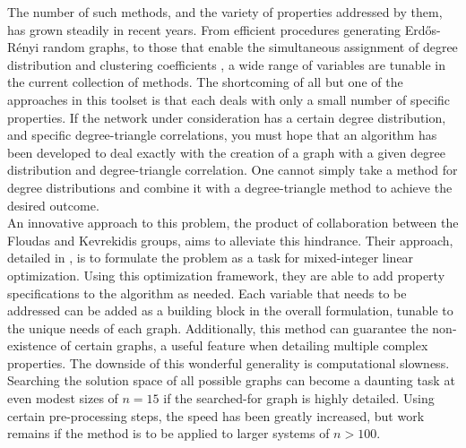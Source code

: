 \documentclass[11pt]{article}
\begin{document}
The number of such methods, and the variety of properties addressed by them, has grown steadily in recent years. From efficient procedures generating Erd\H{o}s-R\'{e}nyi random graphs, to those that enable the simultaneous assignment of degree distribution and clustering coefficients \cite{Batagelj2005} \cite{Deijfen2009}, a wide range of variables are tunable in the current collection of methods. The shortcoming of all but one of the approaches in this toolset is that each deals with only a small number of specific properties. If the network under consideration has a certain degree distribution, and specific degree-triangle correlations, you must hope that an algorithm has been developed to deal exactly with the creation of a graph with a given degree distribution and degree-triangle correlation. One cannot simply take a method for degree distributions and combine it with a degree-triangle method to achieve the desired outcome. \vspace{1mm}\\
An innovative approach to this problem, the product of collaboration between the Floudas and Kevrekidis groups, aims to alleviate this hindrance. Their approach, detailed in \cite{Gounaris2013}, is to formulate the problem as a task for mixed-integer linear optimization. Using this optimization framework, they are able to add property specifications to the algorithm as needed. Each variable that needs to be addressed can be added as a building block in the overall formulation, tunable to the unique needs of each graph. Additionally, this method can guarantee the non-existence of certain graphs, a useful feature when detailing multiple complex properties. The downside of this wonderful generality is computational slowness. Searching the solution space of all possible graphs can become a daunting task at even modest sizes of $n=15$ if the searched-for graph is highly detailed. Using certain pre-processing steps, the speed has been greatly increased, but work remains if the method is to be applied to larger systems of $n>100$. 
\end{document}
